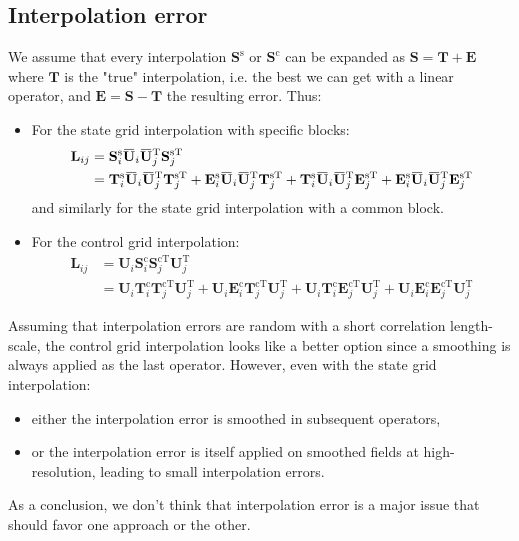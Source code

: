 \documentclass[12pt]{scrartcl}
\newcommand{\overbar}[1]{\mkern 1.5mu\overline{\mkern-1.5mu#1\mkern-1.5mu}\mkern 1.5mu}
\begin{document}
\subsection{Interpolation error}
We assume that every interpolation $\mathbf{S}^\mathrm{s}$ or $\mathbf{S}^\mathrm{c}$ can be expanded as $\mathbf{S} = \mathbf{T} + \mathbf{E}$ where $\mathbf{T}$ is the "true" interpolation, i.e. the best we can get with a linear operator, and $\mathbf{E} = \mathbf{S} - \mathbf{T}$ the resulting error.
Thus:
\begin{itemize}
\item For the state grid interpolation with specific blocks:
\begin{align}
\mathbf{L}_{ij} & = \mathbf{S}^\mathrm{s}_i \overbar{\mathbf{U}}_i \overbar{\mathbf{U}}_j^\mathrm{T} \mathbf{S}_j^{\mathrm{s} \mathrm{T}} \nonumber \\
& = \mathbf{T}^\mathrm{s}_i \overbar{\mathbf{U}}_i \overbar{\mathbf{U}}_j^\mathrm{T} \mathbf{T}_j^{\mathrm{s} \mathrm{T}} + \mathbf{E}^\mathrm{s}_i \overbar{\mathbf{U}}_i \overbar{\mathbf{U}}_j^\mathrm{T} \mathbf{T}_j^{\mathrm{s} \mathrm{T}} + \mathbf{T}^\mathrm{s}_i \overbar{\mathbf{U}}_i \overbar{\mathbf{U}}_j^\mathrm{T} \mathbf{E}_j^{\mathrm{s} \mathrm{T}} + \mathbf{E}^\mathrm{s}_i \overbar{\mathbf{U}}_i \overbar{\mathbf{U}}_j^\mathrm{T} \mathbf{E}_j^{\mathrm{s} \mathrm{T}}
\end{align}
and similarly for the state grid interpolation with a common block.
\item For the control grid interpolation:
\begin{align}
\mathbf{L}_{ij} & = \mathbf{U}_i \mathbf{S}^\mathrm{c}_i \mathbf{S}_j^{\mathrm{c} \mathrm{T}} \mathbf{U}_j^\mathrm{T} \nonumber \\
& = \mathbf{U}_i \mathbf{T}^\mathrm{c}_i \mathbf{T}_j^{\mathrm{c} \mathrm{T}} \mathbf{U}_j^\mathrm{T} + \mathbf{U}_i \mathbf{E}^\mathrm{c}_i \mathbf{T}_j^{\mathrm{c} \mathrm{T}} \mathbf{U}_j^\mathrm{T} + \mathbf{U}_i \mathbf{T}^\mathrm{c}_i \mathbf{E}_j^{\mathrm{c} \mathrm{T}} \mathbf{U}_j^\mathrm{T} + \mathbf{U}_i \mathbf{E}^\mathrm{c}_i \mathbf{E}_j^{\mathrm{c} \mathrm{T}} \mathbf{U}_j^\mathrm{T}
\end{align}
\end{itemize}
Assuming that interpolation errors are random with a short correlation length-scale, the control grid interpolation looks like a better option since a smoothing is always applied as the last operator. However, even with the state grid interpolation:
\begin{itemize}
\item either the interpolation error is smoothed in subsequent operators,
\item or the interpolation error is itself applied on smoothed fields at high-resolution, leading to small interpolation errors.
\end{itemize}
As a conclusion, we don't think that interpolation error is a major issue that should favor one approach or the other.
\end{document}
